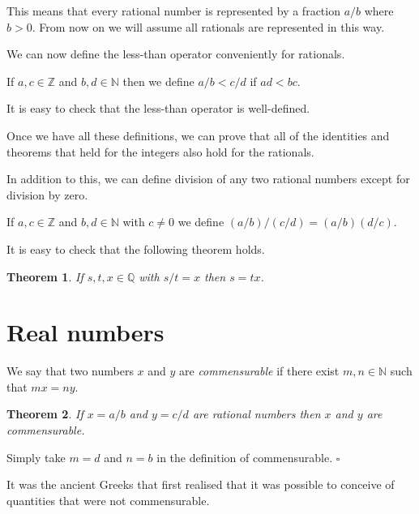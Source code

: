 \documentclass[10pt]{article}
\newcommand{\Z}{\mathbb{Z}}
\newcommand{\N}{\mathbb{N}}
\newcommand{\Q}{\mathbb{Q}}
\newcommand{\qed}{\square}
\newtheorem{theorem}{Theorem}[section]
\newenvironment{proof}[1][Proof]{\begin{trivlist}
\item[\hskip \labelsep {\bfseries #1}]}{\end{trivlist}}
\newenvironment{definition}[1][Definition]{\begin{trivlist}
\item[\hskip \labelsep {\bfseries #1}]}{\end{trivlist}}
\begin{document}
This means that every rational number is represented by a fraction $a/b$ where $b > 0$. From now on we will assume all rationals are represented in this way.

We can now define the less-than operator conveniently for rationals.

\begin{definition}
If $a, c \in \Z$ and $b, d \in \N$ then we define $a/b < c/d$ if $ad < bc$.
\end{definition}

It is easy to check that the less-than operator is well-defined.

Once we have all these definitions, we can prove that all of the identities and theorems that held for the integers also hold for the rationals.

In addition to this, we can define division of any two rational numbers except for division by zero.

\begin{definition}
If $a, c \in \Z$ and $b, d \in \N$ with $c \neq 0$ we define $(a/b)/(c/d) = (a/b)(d/c)$.
\end{definition}

It is easy to check that the following theorem holds.

\begin{theorem}
If $s, t, x \in \Q$ with $s/t = x$ then $s = tx$.
\end{theorem}

\section{Real numbers}

\begin{definition}
We say that two numbers $x$ and $y$ are \emph{commensurable} if there exist $m, n \in \N$ such that $mx = ny$.
\end{definition}

\begin{theorem}
If $x = a/b$ and $y = c/d$ are rational numbers then $x$ and $y$ are commensurable.
\end{theorem}

\begin{proof}
Simply take $m = d$ and $n = b$ in the definition of commensurable. $\qed$
\end{proof}

It was the ancient Greeks that first realised that it was possible to conceive of quantities that were not commensurable.
\end{document}
